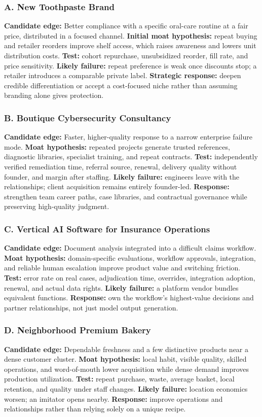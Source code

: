 \subsubsection{A. New Toothpaste Brand}
\textbf{Candidate edge:} Better compliance with a specific oral-care routine at a fair price, distributed in a focused channel. \textbf{Initial moat hypothesis:} repeat buying and retailer reorders improve shelf access, which raises awareness and lowers unit distribution costs. \textbf{Test:} cohort repurchase, unsubsidized reorder, fill rate, and price sensitivity. \textbf{Likely failure:} repeat preference is weak once discounts stop; a retailer introduces a comparable private label. \textbf{Strategic response:} deepen credible differentiation or accept a cost-focused niche rather than assuming branding alone gives protection.

\subsubsection{B. Boutique Cybersecurity Consultancy}
\textbf{Candidate edge:} Faster, higher-quality response to a narrow enterprise failure mode. \textbf{Moat hypothesis:} repeated projects generate trusted references, diagnostic libraries, specialist training, and repeat contracts. \textbf{Test:} independently verified remediation time, referral source, renewal, delivery quality without founder, and margin after staffing. \textbf{Likely failure:} engineers leave with the relationships; client acquisition remains entirely founder-led. \textbf{Response:} strengthen team career paths, case libraries, and contractual governance while preserving high-quality judgment.

\subsubsection{C. Vertical AI Software for Insurance Operations}
\textbf{Candidate edge:} Document analysis integrated into a difficult claims workflow. \textbf{Moat hypothesis:} domain-specific evaluations, workflow approvals, integration, and reliable human escalation improve product value and switching friction. \textbf{Test:} error rate on real cases, adjudication time, overrides, integration adoption, renewal, and actual data rights. \textbf{Likely failure:} a platform vendor bundles equivalent functions. \textbf{Response:} own the workflow's highest-value decisions and partner relationships, not just model output generation.

\subsubsection{D. Neighborhood Premium Bakery}
\textbf{Candidate edge:} Dependable freshness and a few distinctive products near a dense customer cluster. \textbf{Moat hypothesis:} local habit, visible quality, skilled operations, and word-of-mouth lower acquisition while dense demand improves production utilization. \textbf{Test:} repeat purchase, waste, average basket, local retention, and quality under staff changes. \textbf{Likely failure:} location economics worsen; an imitator opens nearby. \textbf{Response:} improve operations and relationships rather than relying solely on a unique recipe.

